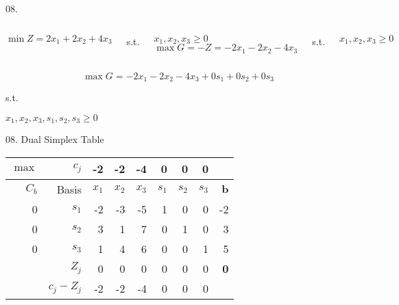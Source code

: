 \begin{frameExample}{08.}{}
  \begin{columns}
\[\min Z = 2x_1 + 2x_2 + 4x_3  \]

  s.t.

$    x_1, x_2, x_3  \geq 0$
 \[ \max G =  -Z = -2x_1 - 2x_2 - 4x_3 \]

  s.t.

$    x_1, x_2, x_3  \geq 0$
  \end{columns}
\end{frameExample}

\begin{frameExample}{08}{}
  \[ \max G= -2x_1 - 2x_2 - 4x_3 + 0s_1 + 0s_2 + 0s_3 \]

  s.t.

$    x_1, x_2, x_3, s_1, s_2, s_3  \geq 0$
\end{frameExample}

\begin{frameExample}{08. Dual Simplex Table}{}
  {\centering
    \begin{tabular}{rrrrrrrrr}
      \toprule
      $\max$&$c_j$&-2&-2&-4&0&0&0\\
      \midrule
      $C_b$&Basis&$x_1$&$x_2$&$x_3$&$s_1$&$s_2$&$s_3$&$\mathbf{b}$\\
      \midrule
      0&$s_1$&-2&-3&-5&1&0&0&-2\\
      0&$s_2$&3&1&7&0&1&0&3\\
      0&$s_3$&1&4&6&0&0&1&5\\
      \midrule
      &$Z_j$&0&0&0&0&0&0&\textbf{0}\\
      &$c_j - Z_j$&-2&-2&-4&0&0&0\\
      \bottomrule
    \end{tabular}
  \par}
\end{frameExample}


